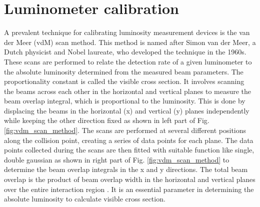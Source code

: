 \chapter{Luminometer calibration}  %

\ifpdf
    \graphicspath{{Chapter3/Figs/Raster/}{Chapter3/Figs/PDF/}{Chapter3/Figs/}}
\else
    \graphicspath{{Chapter3/Figs/Vector/}{Chapter3/Figs/}}
\fi


A prevalent technique for calibrating luminosity measurement devices is the van der Meer (vdM) scan method. This method is named after Simon van der Meer, a Dutch physicist and Nobel laureate, who developed the technique in the 1960s. These scans are performed to relate the detection rate of a given luminometer to the absolute luminosity determined from the measured beam parameters. The proportionality constant is called the visible cross section. It involves scanning the beams across each other in the horizontal and vertical planes to measure the beam overlap integral, which is proportional to the luminosity. %
This is done by displacing the beams in the horizontal (x) and vertical (y) planes independently while keeping the other direction fixed as shown in left part of Fig. \ref{fig:vdm_scan_method}. The scans are performed at several different positions along the collision point, creating a series of data points for each plane. The data points collected during the scans are then fitted with  suitable function like single, double gaussian as shown in right part of Fig. \ref{fig:vdm_scan_method}  to determine the beam overlap integrals in the x and y directions. %
The total beam overlap is the product of beam overlap width in the horizontal and vertical planes over the entire interaction region \cite{vanderMeer1968}. It is an essential parameter in determining the absolute luminosity to calculate visible cross section. 


